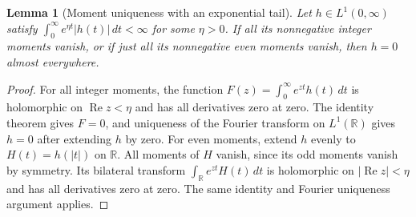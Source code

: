 \documentclass[11pt,a4paper]{article}
\newtheorem{lemma}[theorem]{Lemma}
\theoremstyle{definition}
\theoremstyle{remark}
\numberwithin{equation}{section}
\begin{document}
\begin{lemma}[Moment uniqueness with an exponential tail]
\label{V:new:mellin-exp-tail}
Let $h\in L^1(0,\infty)$ satisfy
$\int_0^\infty e^{\eta t}|h(t)|\,dt<\infty$ for some $\eta>0$.
If all its nonnegative integer moments vanish, or if just all its
nonnegative even moments vanish, then $h=0$ almost everywhere.
\end{lemma}
\begin{proof}
For all integer moments, the function
$F(z)=\int_0^\infty e^{zt}h(t)\,dt$ is holomorphic on
$\operatorname{Re}z<\eta$ and has all derivatives zero at zero.
The identity theorem gives $F=0$, and uniqueness of the Fourier
transform on $L^1(\mathbb R)$ gives $h=0$ after extending $h$ by zero.
For even moments, extend $h$ evenly to $H(t)=h(|t|)$ on $\mathbb R$.
All moments of $H$ vanish, since its odd moments vanish by symmetry.
Its bilateral transform $\int_{\mathbb R}e^{zt}H(t)\,dt$ is
holomorphic on $|\operatorname{Re}z|<\eta$ and has all derivatives
zero at zero. The same identity and Fourier uniqueness argument applies.
\end{proof}
\end{document}

